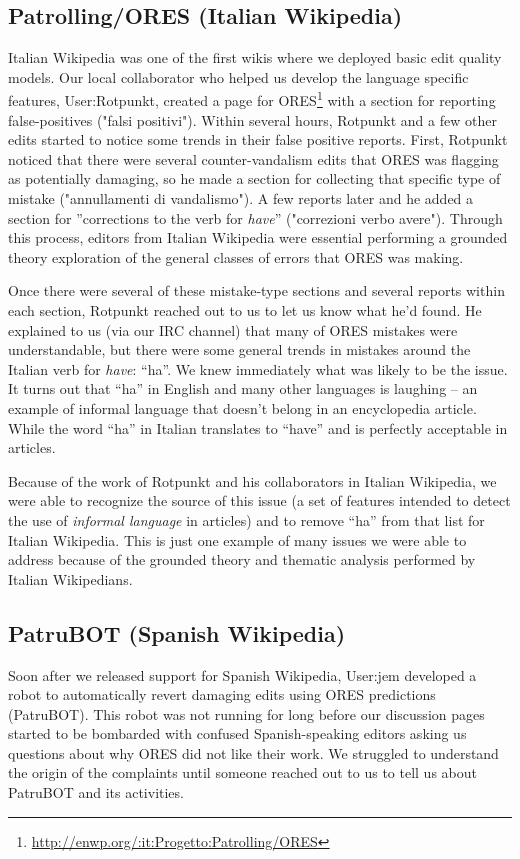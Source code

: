 \subsection{Patrolling/ORES (Italian Wikipedia)}
Italian Wikipedia was one of the first wikis where we deployed basic edit quality models.  Our local collaborator who helped us develop the language specific features, User:Rotpunkt, created a page for ORES\footnote{\url{http://enwp.org/:it:Progetto:Patrolling/ORES}} with a section for reporting false-positives ("falsi positivi").  Within several hours, Rotpunkt and a few other edits started to notice some trends in their false positive reports.  First, Rotpunkt noticed that there were several counter-vandalism edits that ORES was flagging as potentially damaging, so he made a section for collecting that specific type of mistake ("annullamenti di vandalismo").  A few reports later and he added a section for ''corrections to the verb for \emph{have}'' ("correzioni verbo avere").  Through this process, editors from Italian Wikipedia were essential performing a grounded theory exploration of the general classes of errors that ORES was making.

Once there were several of these mistake-type sections and several reports within each section, Rotpunkt reached out to us to let us know what he'd found.  He explained to us (via our IRC channel) that many of ORES mistakes were understandable, but there were some general trends in mistakes around the Italian verb for \emph{have}: ``ha''.  We knew immediately what was likely to be the issue.  It turns out that ``ha'' in English and many other languages is laughing -- an example of informal language that doesn't belong in an encyclopedia article.  While the word ``ha'' in Italian translates to ``have'' and is perfectly acceptable in articles.

Because of the work of Rotpunkt and his collaborators in Italian Wikipedia, we were able to recognize the source of this issue (a set of features intended to detect the use of \emph{informal language} in articles) and to remove ``ha'' from that list for Italian Wikipedia.  This is just one example of many issues we were able to address because of the grounded theory and thematic analysis performed by Italian Wikipedians.

\subsection{PatruBOT (Spanish Wikipedia)}
Soon after we released support for Spanish Wikipedia, User:jem developed a robot to automatically revert damaging edits using ORES predictions (PatruBOT).  This robot was not running for long before our discussion pages started to be bombarded with confused Spanish-speaking editors asking us questions about why ORES did not like their work.  We struggled to understand the origin of the complaints until someone reached out to us to tell us about PatruBOT and its activities.

